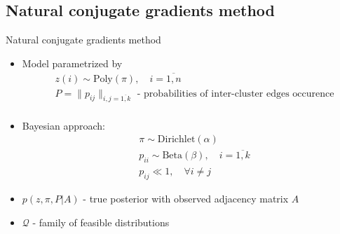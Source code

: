 \documentclass{beamer}
\theoremstyle{definition}
\theoremstyle{plain}
\theoremstyle{remark}
\begin{document}
		\subsection{Natural conjugate gradients method}
			\begin{frame}{Natural conjugate gradients method} %
                \begin{itemize}
                    \item Model parametrized by
                        \begin{equation}
                            \begin{aligned}
                            \nonumber
                                & z(i) \sim \text{Poly}(\pi), \quad i=\overline{1, n} \\
                                & P = \| p_{ij} \|_{i,j=\overline{1,k}} \text{ - probabilities of inter-cluster edges occurence} \\
                            \end{aligned}
                        \end{equation}
                
                    \item Bayesian approach:
                    \begin{equation}
                        \begin{aligned}
                        \nonumber
                            & \pi \sim \text{Dirichlet}(\alpha) \\
                            & p_{ii} \sim \text{Beta}(\beta), \quad i = \overline{1,k} \\
                            & p_{ij} \ll 1, \quad \forall i\neq j
                        \end{aligned}
                    \end{equation}
                    \item $p(z, \pi, P | A)$ - true posterior with observed adjacency matrix $A$
                    \item $\mathcal Q$ - family of feasible distributions            
                \end{itemize}

			\end{frame}
\end{document}
